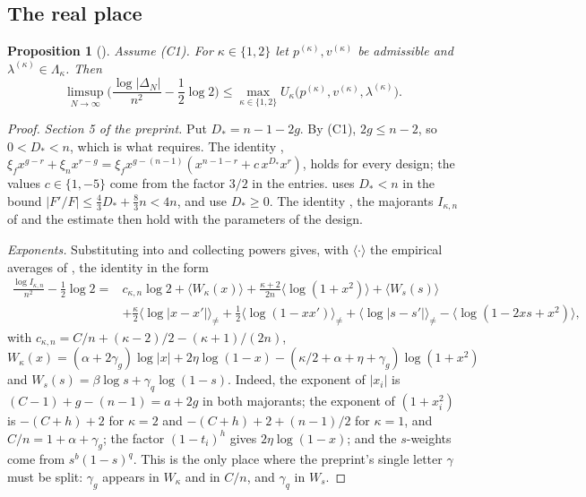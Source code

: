 \documentclass[11pt]{article}
\newtheorem{proposition}[theorem]{Proposition}
\theoremstyle{definition}
\begin{document}
\subsection{The real place}\label{sec:real}

\begin{proposition}[{\cite[Props.~5.2, 5.3, 6.1]{OAI}}]\label{prop:up}
Assume (C1). For $\kappa\in\{1,2\}$ let $p^{(\kappa)},v^{(\kappa)}$ be admissible and $\lambda^{(\kappa)}\in\Lambda_\kappa$. Then
\[
\limsup_{N\to\infty}\Big(\frac{\log|\Delta_N|}{n^2}-\frac12\log2\Big)\le\max_{\kappa\in\{1,2\}}U_\kappa\big(p^{(\kappa)},v^{(\kappa)},\lambda^{(\kappa)}\big).
\]
\end{proposition}

\begin{proof}
\emph{Section 5 of the preprint.} Put $D_*=n-1-2g$. By (C1), $2g\le n-2$, so $0<D_*<n$, which is what \cite[Eq.~(61)]{OAI} requires. The identity \cite[Eq.~(66)]{OAI}, $\xi_fx^{g-r}+\xi_nx^{r-g}=\xi_fx^{g-(n-1)}(x^{n-1-r}+c\,x^{D_*}x^r)$, holds for every design; the values $c\in\{1,-5\}$ come from the factor $3/2$ in the entries. \cite[Lemma~5.1]{OAI} uses $D_*<n$ in the bound $|F'/F|\le\frac43D_*+\frac83n<4n$, and \cite[Props.~5.2, 5.3]{OAI} use $D_*\ge0$. The identity \cite[Eq.~(65)]{OAI}, the majorants $I_{\kappa,n}$ of \cite[Eq.~(74)]{OAI} and the estimate \cite[Eq.~(75)]{OAI} then hold with the parameters of the design.

\emph{Exponents.} Substituting \cite[Eq.~(79)]{OAI} into \cite[Eq.~(74)]{OAI} and collecting powers gives, with $\langle\cdot\rangle$ the empirical averages of \cite[Sec.~6]{OAI}, the identity \cite[Eq.~(80)]{OAI} in the form
\begin{align*}
\frac{\log I_{\kappa,n}}{n^2}-\frac12\log2={}&c_{\kappa,n}\log2+\langle W_\kappa(x)\rangle+\frac{\kappa+2}{2n}\langle\log(1+x^2)\rangle+\langle W_s(s)\rangle\\
&+\frac\kappa2\langle\log|x-x'|\rangle_{\ne}+\frac12\langle\log(1-xx')\rangle_{\ne}+\langle\log|s-s'|\rangle_{\ne}-\langle\log(1-2xs+x^2)\rangle,
\end{align*}
with $c_{\kappa,n}=C/n+(\kappa-2)/2-(\kappa+1)/(2n)$, $W_\kappa(x)=(\alpha+2\gamma_g)\log|x|+2\eta\log(1-x)-(\kappa/2+\alpha+\eta+\gamma_g)\log(1+x^2)$ and $W_s(s)=\beta\log s+\gamma_q\log(1-s)$. Indeed, the exponent of $|x_i|$ is $(C-1)+g-(n-1)=a+2g$ in both majorants; the exponent of $(1+x_i^2)$ is $-(C+h)+2$ for $\kappa=2$ and $-(C+h)+2+(n-1)/2$ for $\kappa=1$, and $C/n=1+\alpha+\gamma_g$; the factor $(1-t_i)^h$ gives $2\eta\log(1-x)$; and the $s$-weights come from $s^b(1-s)^q$. This is the only place where the preprint's single letter $\gamma$ must be split: $\gamma_g$ appears in $W_\kappa$ and in $C/n$, and $\gamma_q$ in $W_s$.


\end{proof}
\end{document}
